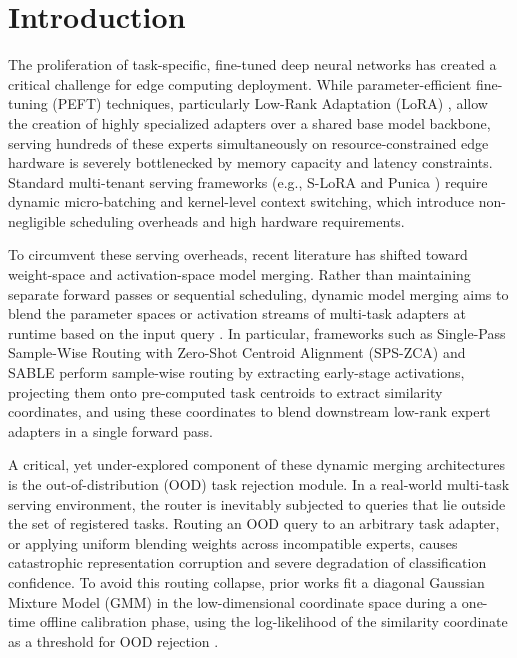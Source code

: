 \section{Introduction}
\label{submission:sec:intro}

The proliferation of task-specific, fine-tuned deep neural networks has created a critical challenge for edge computing deployment. While parameter-efficient fine-tuning (PEFT) techniques, particularly Low-Rank Adaptation (LoRA) \cite{hu2021lora}, allow the creation of highly specialized adapters over a shared base model backbone, serving hundreds of these experts simultaneously on resource-constrained edge hardware is severely bottlenecked by memory capacity and latency constraints. Standard multi-tenant serving frameworks (e.g., S-LoRA \cite{sheng2023slora} and Punica \cite{chen2023punica}) require dynamic micro-batching and kernel-level context switching, which introduce non-negligible scheduling overheads and high hardware requirements.

To circumvent these serving overheads, recent literature has shifted toward weight-space and activation-space model merging. Rather than maintaining separate forward passes or sequential scheduling, dynamic model merging aims to blend the parameter spaces or activation streams of multi-task adapters at runtime based on the input query \cite{ilharco2022editing, wortsman2022model, yadav2023ties, stoica2023zipit}. In particular, frameworks such as Single-Pass Sample-Wise Routing with Zero-Shot Centroid Alignment (SPS-ZCA) \cite{pfsr2025} and SABLE \cite{mbh2025} perform sample-wise routing by extracting early-stage activations, projecting them onto pre-computed task centroids to extract similarity coordinates, and using these coordinates to blend downstream low-rank expert adapters in a single forward pass.

A critical, yet under-explored component of these dynamic merging architectures is the out-of-distribution (OOD) task rejection module. In a real-world multi-task serving environment, the router is inevitably subjected to queries that lie outside the set of registered tasks. Routing an OOD query to an arbitrary task adapter, or applying uniform blending weights across incompatible experts, causes catastrophic representation corruption and severe degradation of classification confidence. To avoid this routing collapse, prior works fit a diagonal Gaussian Mixture Model (GMM) in the low-dimensional coordinate space during a one-time offline calibration phase, using the log-likelihood of the similarity coordinate as a threshold for OOD rejection \cite{pfsr2025}.

